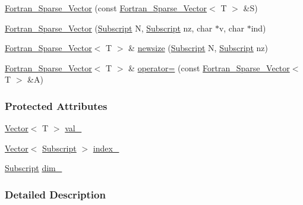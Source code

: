 \begin{DoxyCompactItemize}
\item 
\hyperlink{class_t_n_t_1_1_fortran___sparse___vector_a1b6685f3b7f51607925586644719f693}{Fortran\_\-Sparse\_\-Vector} (const \hyperlink{class_t_n_t_1_1_fortran___sparse___vector}{Fortran\_\-Sparse\_\-Vector}$<$ T $>$ \&S)
\item 
\hyperlink{class_t_n_t_1_1_fortran___sparse___vector_a4d9ebef702dca1cac77930868044c7ba}{Fortran\_\-Sparse\_\-Vector} (\hyperlink{namespace_t_n_t_af22e3f1460e145c04ce4e7d701e4c1c1}{Subscript} N, \hyperlink{namespace_t_n_t_af22e3f1460e145c04ce4e7d701e4c1c1}{Subscript} nz, char $\ast$v, char $\ast$ind)
\item 
\hyperlink{class_t_n_t_1_1_fortran___sparse___vector}{Fortran\_\-Sparse\_\-Vector}$<$ T $>$ \& \hyperlink{class_t_n_t_1_1_fortran___sparse___vector_adb3cb1fbea76729eadf206509d29069a}{newsize} (\hyperlink{namespace_t_n_t_af22e3f1460e145c04ce4e7d701e4c1c1}{Subscript} N, \hyperlink{namespace_t_n_t_af22e3f1460e145c04ce4e7d701e4c1c1}{Subscript} nz)
\item 
\hyperlink{class_t_n_t_1_1_fortran___sparse___vector}{Fortran\_\-Sparse\_\-Vector}$<$ T $>$ \& \hyperlink{class_t_n_t_1_1_fortran___sparse___vector_a1ee7cfb614263b11d23524d411904fe0}{operator=} (const \hyperlink{class_t_n_t_1_1_fortran___sparse___vector}{Fortran\_\-Sparse\_\-Vector}$<$ T $>$ \&A)
\end{DoxyCompactItemize}
\subsubsection*{Protected Attributes}
\begin{DoxyCompactItemize}
\item 
\hyperlink{class_t_n_t_1_1_vector}{Vector}$<$ T $>$ \hyperlink{class_t_n_t_1_1_fortran___sparse___vector_a7b3fc0cdf3104147267ed1d7b5177234}{val\_\-}
\item 
\hyperlink{class_t_n_t_1_1_vector}{Vector}$<$ \hyperlink{namespace_t_n_t_af22e3f1460e145c04ce4e7d701e4c1c1}{Subscript} $>$ \hyperlink{class_t_n_t_1_1_fortran___sparse___vector_a586e6e20ad6a08b4aa6c77eb1c0becb6}{index\_\-}
\item 
\hyperlink{namespace_t_n_t_af22e3f1460e145c04ce4e7d701e4c1c1}{Subscript} \hyperlink{class_t_n_t_1_1_fortran___sparse___vector_a3d2b44cb2a162d2dac3c53cfb97d1494}{dim\_\-}
\end{DoxyCompactItemize}


\subsubsection{Detailed Description}
